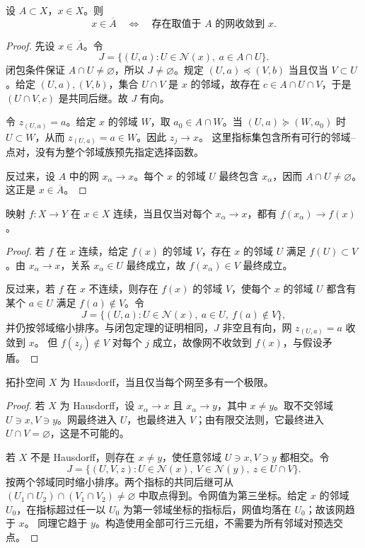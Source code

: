 \begin{theorem}[网刻画闭包]\label{theorem:1-1-1-2}
设 \(A\subset X\)，\(x\in X\)。则
\[
  x\in\overline A
  \quad\Longleftrightarrow\quad
  \text{存在取值于 \(A\) 的网收敛到 \(x\)}.
\]
\end{theorem}
\begin{proof}
先设 \(x\in\overline A\)。令
\[
  J=\{(U,a):U\in\mathcal N(x),\ a\in A\cap U\}.
\]
闭包条件保证 \(A\cap U\ne\varnothing\)，所以 \(J\ne\varnothing\)。规定
\((U,a)\preceq(V,b)\) 当且仅当 \(V\subset U\)。给定 \((U,a),(V,b)\)，集合 \(U\cap V\)
是 \(x\) 的邻域，故存在 \(c\in A\cap U\cap V\)，于是 \((U\cap V,c)\) 是共同后继。故 \(J\) 有向。

令 \(z_{(U,a)}=a\)。给定 \(x\) 的邻域 \(W\)，取 \(a_0\in A\cap W\)。当
\((U,a)\succeq(W,a_0)\) 时 \(U\subset W\)，从而 \(z_{(U,a)}=a\in W\)。因此 \(z_j\to x\)。
这里指标集包含所有可行的邻域--点对，没有为整个邻域族预先指定选择函数。

反过来，设 \(A\) 中的网 \(x_\alpha\to x\)。每个 \(x\) 的邻域 \(U\) 最终包含 \(x_\alpha\)，因而
\(A\cap U\ne\varnothing\)。这正是 \(x\in\overline A\)。
\end{proof}

\begin{theorem}[连续性的网判别]\label{theorem:1-1-1-3}
映射 \(f:X\to Y\) 在 \(x\in X\) 连续，当且仅当对每个 \(x_\alpha\to x\)，都有
\(f(x_\alpha)\to f(x)\)。
\end{theorem}
\begin{proof}
若 \(f\) 在 \(x\) 连续，给定 \(f(x)\) 的邻域 \(V\)，存在 \(x\) 的邻域 \(U\) 满足
\(f(U)\subset V\)。由 \(x_\alpha\to x\)，关系 \(x_\alpha\in U\) 最终成立，故
\(f(x_\alpha)\in V\) 最终成立。

反过来，若 \(f\) 在 \(x\) 不连续，则存在 \(f(x)\) 的邻域 \(V\)，使每个 \(x\) 的邻域 \(U\)
都含有某个 \(a\in U\) 满足 \(f(a)\notin V\)。令
\[
  J=\{(U,a):U\in\mathcal N(x),\ a\in U,\ f(a)\notin V\},
\]
并仍按邻域缩小排序。与闭包定理的证明相同，\(J\) 非空且有向，网 \(z_{(U,a)}=a\) 收敛到 \(x\)。
但 \(f(z_j)\notin V\) 对每个 \(j\) 成立，故像网不收敛到 \(f(x)\)，与假设矛盾。
\end{proof}

\begin{proposition}[Hausdorff 判别]\label{proposition:1-1-1-4}
拓扑空间 \(X\) 为 Hausdorff，当且仅当每个网至多有一个极限。
\end{proposition}
\begin{proof}
若 \(X\) 为 Hausdorff，设 \(x_\alpha\to x\) 且 \(x_\alpha\to y\)，其中 \(x\ne y\)。取不交邻域
\(U\ni x,V\ni y\)。网最终进入 \(U\)，也最终进入 \(V\)；由有限交法则，它最终进入
\(U\cap V=\varnothing\)，这是不可能的。

若 \(X\) 不是 Hausdorff，则存在 \(x\ne y\)，使任意邻域 \(U\ni x,V\ni y\) 都相交。令
\[
 J=\{(U,V,z):U\in\mathcal N(x),\ V\in\mathcal N(y),\ z\in U\cap V\}.
\]
按两个邻域同时缩小排序。两个指标的共同后继可从
\((U_1\cap U_2)\cap(V_1\cap V_2)\ne\varnothing\) 中取点得到。令网值为第三坐标。给定 \(x\) 的邻域
\(U_0\)，在指标超过任一以 \(U_0\) 为第一邻域坐标的指标后，网值均落在 \(U_0\)；故该网趋于 \(x\)。
同理它趋于 \(y\)。构造使用全部可行三元组，不需要为所有邻域对预选交点。
\end{proof}

